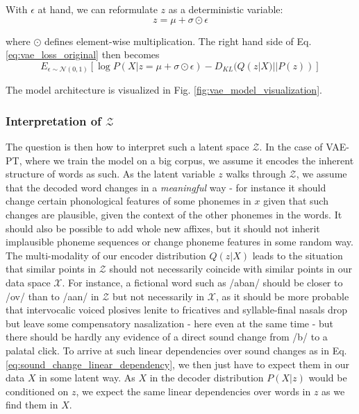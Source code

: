\documentclass[6pt]{article}
\begin{document}
With $\epsilon$ at hand, we can reformulate $z$ as a deterministic variable:
\begin{equation}
z = \mu + \sigma \odot \epsilon
\end{equation}

where $\odot$ defines element-wise multiplication.
The right hand side of Eq. \ref{eq:vae_loss_original} then becomes
\begin{equation}
\label{eq:vae_loss_reparameterized}
E_{\epsilon \sim \mathcal{N}(0,1)}[\log P(X|z= \mu + \sigma \odot \epsilon) - D_{KL}(Q(z|X)||P(z))] 
\end{equation}

The model architecture is visualized in Fig. \ref{fig:vae_model_visualization}. 




\subsubsection{Interpretation of $\mathcal{Z}$}
\label{interpretation_of_z}
The question is then how to interpret such a latent space $\mathcal{Z}$. In the case of VAE-PT, where we train the model on a big corpus, we assume it encodes the inherent structure of words as such. As the latent variable $z$ walks through $\mathcal{Z}$, we assume that the decoded word changes in a \textit{meaningful} way - for instance it should change certain phonological features of some phonemes in $x$ given that such changes are plausible, given the context of the other phonemes in the words. It should also be possible to add whole new affixes, but it should not inherit implausible phoneme sequences or change phoneme features in some random way. The multi-modality of our encoder distribution $Q(z|X)$ leads to the situation that similar points in $\mathcal{Z}$ should not necessarily coincide with similar points in our data space $\mathcal{X}$. For instance, a fictional word such as /aban/ should be closer to /ov/ than to /a\textipa{\textdoublebarpipe}an/ in $\mathcal{Z}$ but not necessarily in $\mathcal{X}$, as it should be more probable that intervocalic voiced plosives lenite to fricatives and syllable-final nasals drop but leave some compensatory nasalization - here even at the same time - but there should be hardly any evidence of a direct sound change from /b/ to a palatal click. To arrive at such linear dependencies over sound changes as in Eq. \ref{eq:sound_change_linear_dependency}, we then just have to expect them in our data $X$ in some latent way. As $X$ in the decoder distribution $P(X|z)$ would be conditioned on $z$, we expect the same linear dependencies over words in $z$ as we find them in $X$.
\end{document}
